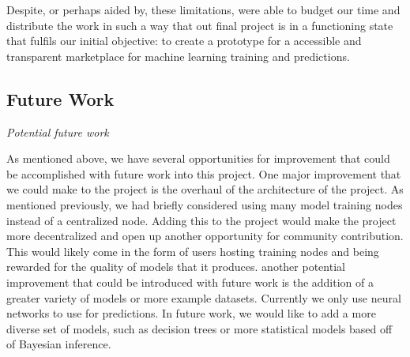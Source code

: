\documentclass{article}
\begin{document}
    Despite, or perhaps aided by, these limitations, were able to budget our time and distribute the work in such a way
    that out final project is in a functioning state that fulfils our initial objective: to create a prototype for a
    accessible and transparent marketplace for machine learning training and predictions.

    \subsection{Future Work}
    \emph{Potential future work}

    As mentioned above, we have several opportunities for improvement that could be accomplished with future work
    into this project.  One major improvement that we could make to the project is the overhaul of the architecture of
    the project.  As mentioned previously, we had briefly considered using many model training nodes instead of a
    centralized node.  Adding this to the project would make the project more decentralized and open up another opportunity
    for community contribution.  This would likely come in the form of users hosting training nodes and being rewarded for
    the quality of models that it produces.  another potential improvement that could be introduced with future work is
    the addition of a greater variety of models or more example datasets.  Currently we only use neural networks to
    use for predictions.  In future work, we would like to add a more diverse set of models, such as decision trees or
    more statistical models based off of Bayesian inference.

    \pagebreak
    
\end{document}
